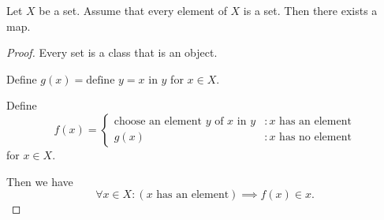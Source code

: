 \documentclass{article}
\begin{document}
  \begin{forthel}
    \begin{proposition}
      Let $X$ be a set.
      Assume that every element of $X$ is a set.
      Then there exists a map.
    \end{proposition}
    \begin{proof}
      Every set is a class that is an object.

      Define $g(x) = \text{define $y = {x}$ in $y$}$ for $x \in X$.

      Define \[ f(x) =
        \begin{cases}
          \text{choose an element $y$ of $x$ in $y$} & : \text{$x$ has an element} \\
          g(x)                                       & : \text{$x$ has no element}
        \end{cases} \]
      for $x \in X$.

      Then we have
      \[ \forall x \in X: (\text{$x$ has an element}) \implies f(x) \in x. \]
    \end{proof}
  \end{forthel}
\end{document}
